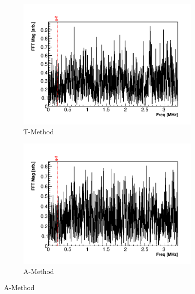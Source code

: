 \begin{figure}[]
\centering
    \begin{subfigure}[t]{0.45\textwidth}
        \centering
        \includegraphics[width=\textwidth]{FFT_TMethod}
        \caption{T-Method}
    \end{subfigure}
    \hspace{1mm}
    \begin{subfigure}[t]{0.45\textwidth}
        \centering
        \includegraphics[width=\textwidth]{FFT_AMethod}
        \caption{A-Method}
    \end{subfigure}%


\end{figure}
